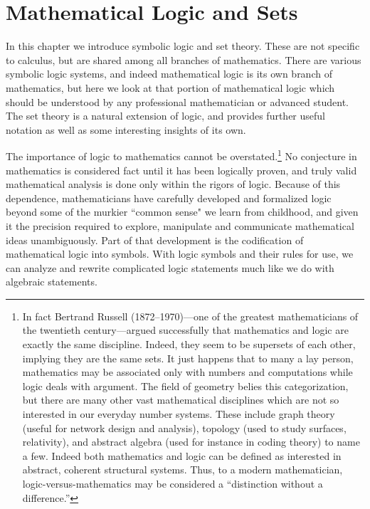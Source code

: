 \chapter{Mathematical Logic and Sets\label{LogicChapter}}

In this chapter we introduce symbolic logic and set theory.
These are not specific to calculus, but are shared among
all  branches of mathematics.  There are various
symbolic logic systems, and indeed mathematical logic is its
own branch of mathematics, but here we look at that portion
of mathematical logic which should be understood by any
professional mathematician or advanced student.  The set theory is a natural
extension of logic, and provides further useful notation
as well as some interesting insights of its own.

The importance of logic to mathematics cannot be overstated.\footnote{
In fact Bertrand Russell (1872--1970)---one of the greatest mathematicians of
the twentieth century---argued successfully that 
mathematics and logic are exactly the same discipline.
Indeed, they seem to be supersets of
each other, implying they are the same sets.
It just happens that to many a lay person, mathematics may be
associated only with numbers and computations while
logic deals with argument. The field of geometry 
belies this categorization, but there are
many other vast mathematical disciplines which are
not so interested in our everyday number systems.
These include graph theory (useful for network design and analysis),
topology (used to study surfaces, relativity), and abstract algebra 
(used for instance in coding
theory) to name a few.  Indeed both mathematics and
logic can be defined as interested in abstract, coherent 
structural systems.  Thus, to a modern mathematician,
logic-versus-mathematics may be considered a ``distinction without
a difference.''
}
No conjecture in mathematics is considered fact until it
has been logically proven, and  truly valid mathematical analysis
is done only within the rigors of logic.
Because of this dependence,  mathematicians have
carefully developed and formalized logic beyond some of the 
murkier ``common sense" we learn from childhood,
and given it the precision required to explore,
manipulate and communicate mathematical ideas unambiguously.  
Part of that development is the codification
of mathematical logic into symbols.
With logic symbols and their rules for use, we can analyze and rewrite
complicated logic statements much like we do with algebraic statements.




